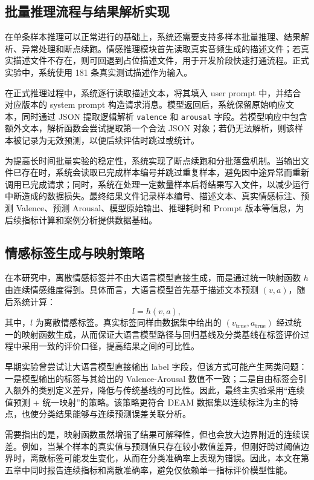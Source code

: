 \subsection{批量推理流程与结果解析实现}

在单条样本推理可以正常进行的基础上，系统还需要支持多样本批量推理、结果解析、异常处理和断点续跑。情感推理模块首先读取真实音频生成的描述文件；若真实描述文件不存在，则可回退到占位描述文件，用于开发阶段快速打通流程。正式实验中，系统使用 181 条真实测试描述作为输入。

在正式推理过程中，系统逐行读取描述文本，将其填入 user prompt 中，并结合对应版本的 system prompt 构造请求消息。模型返回后，系统保留原始响应文本，同时通过 JSON 提取逻辑解析 \texttt{valence} 和 \texttt{arousal} 字段。若模型响应中包含额外文本，解析函数会尝试提取第一个合法 JSON 对象；若仍无法解析，则该样本被记录为无效预测，以便后续评估时跳过或统计。

为提高长时间批量实验的稳定性，系统实现了断点续跑和分批落盘机制。当输出文件已存在时，系统会读取已完成样本编号并跳过重复样本，避免因中途异常而重新调用已完成请求；同时，系统在处理一定数量样本后将结果写入文件，以减少运行中断造成的数据损失。最终结果文件记录样本编号、描述文本、真实情感标注、预测 Valence、预测 Arousal、模型原始输出、推理耗时和 Prompt 版本等信息，为后续指标计算和案例分析提供数据基础。

\subsection{情感标签生成与映射策略}

在本研究中，离散情感标签并不由大语言模型直接生成，而是通过统一映射函数 $h$ 由连续情感维度得到。具体而言，大语言模型首先基于描述文本预测 $(v,a)$，随后系统计算：
\begin{equation}
l = h(v,a),
\end{equation}
其中，$l$ 为离散情感标签。真实标签同样由数据集中给出的 $(v_{\mathrm{true}},a_{\mathrm{true}})$ 经过统一的映射函数生成，从而保证大语言模型路径与回归基线及分类基线在标签评价过程中采用一致的评价口径，提高结果之间的可比性。

早期实验曾尝试让大语言模型直接输出 label 字段，但该方式可能产生两类问题：一是模型输出的标签与其给出的 Valence-Arousal 数值不一致；二是自由标签会引入额外的类别定义差异，降低与传统基线的可比性。因此，最终主实验采用“连续值预测 + 统一映射”的策略。该策略更符合 DEAM 数据集以连续标注为主的特点，也使分类结果能够与连续预测误差关联分析。

需要指出的是，映射函数虽然增强了结果可解释性，但也会放大边界附近的连续误差。例如，当某个样本的真实值与预测值只存在较小数值差异，但刚好跨过阈值边界时，离散标签可能发生变化，从而在分类准确率上表现为错误。因此，本文在第五章中同时报告连续指标和离散准确率，避免仅依赖单一指标评价模型性能。

